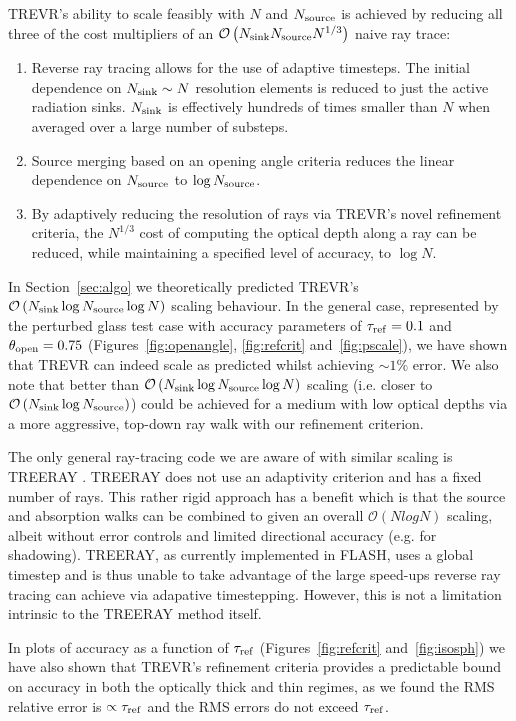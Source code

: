 \documentclass[fleq,usenatbib]{mnras}
\newcommand{\acro}{TREVR}
\newcommand{\bigO}[1]{\mathcal{O}\left(#1\right)}
\newcommand{\NS}{N_{\rm source}}
\newcommand{\NK}{N_{\rm sink}}
\newcommand{\tr}{\tau_{\rm ref}}
\newcommand{\tO}{\theta_{\rm open}}
\begin{document}
{\acro{}'s ability to scale feasibly with $N$ and $\NS$ is achieved by reducing 
all three of the cost multipliers of an $\bigO{\NK \NS N^{1/3}}$ naive ray 
trace:
\begin{enumerate}
\item Reverse ray tracing allows for the use of adaptive timesteps. The 
initial dependence on $\NK \sim N$ resolution elements is reduced to just the 
active radiation sinks. $\NK$ is effectively hundreds of times smaller than 
$N$ when averaged over a large number of substeps.  
\item Source merging based on an opening angle criteria reduces the linear 
dependence on $\NS$ to $\log\NS$.
\item By adaptively reducing the resolution of rays via \acro{}'s novel 
refinement criteria, the $N^{1/3}$ cost of computing the optical depth along a 
ray can be reduced, while maintaining a specified level of accuracy, to 
$\log N$.  
\end{enumerate}

In Section~\ref{sec:algo} we theoretically predicted \acro{}'s 
$\bigO{\NK \log\NS \log N}$ scaling behaviour. In the general case, 
represented by the perturbed glass test case with accuracy parameters of 
$\tr=0.1$ and $\tO=0.75$ (Figures~\ref{fig:openangle}, \ref{fig:refcrit} 
and~\ref{fig:pscale}), we have shown that \acro{} can indeed scale as 
predicted whilst achieving $\sim 1\%$ error. We also note that better than 
$\bigO{\NK\log\NS\log N}$ scaling (i.e. closer to $\bigO{\NK \log\NS}$) could 
be achieved for a medium with low optical depths via a more aggressive, 
top-down ray walk with our refinement criterion. 

The only general ray-tracing code we are aware of with similar scaling is 
TREERAY \citep{HaidEt18}. TREERAY does not use an adaptivity criterion and has 
a fixed number of rays. This rather rigid approach has a benefit which is that 
the source and absorption walks can be combined to given an overall 
$\bigO{N log N}$ scaling, albeit without error controls and limited 
directional accuracy (e.g. for shadowing). TREERAY, as currently implemented 
in FLASH, uses a global timestep and is thus unable to take advantage of the 
large speed-ups reverse ray tracing can achieve via adapative timestepping.
However, this is not a limitation intrinsic to the TREERAY method itself.   

In plots of accuracy as a function of $\tr$ (Figures~\ref{fig:refcrit} 
and~\ref{fig:isosph}) we have also shown that \acro{}'s refinement criteria 
provides a predictable bound on accuracy in both the optically thick and thin 
regimes, as we found the RMS relative error is $\propto \tr$ and the RMS 
errors do not exceed $\tr$.  

}
\end{document}

